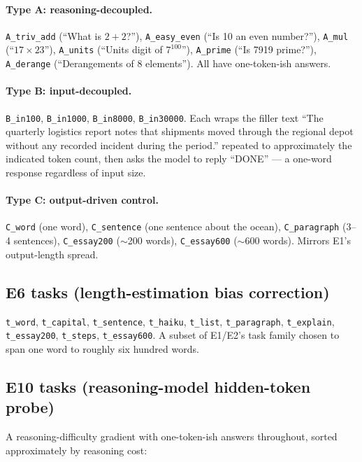 \documentclass[11pt]{article}
\newcommand{\code}[1]{\texttt{\small #1}}
\begin{document}
\paragraph{Type A: reasoning-decoupled.}
\code{A\_triv\_add} (``What is $2+2$?''),
\code{A\_easy\_even} (``Is 10 an even number?''),
\code{A\_mul} (``$17 \times 23$''),
\code{A\_units} (``Units digit of $7^{100}$''),
\code{A\_prime} (``Is 7919 prime?''),
\code{A\_derange} (``Derangements of 8 elements''). All have one-token-ish answers.

\paragraph{Type B: input-decoupled.}
\code{B\_in100}, \code{B\_in1000}, \code{B\_in8000}, \code{B\_in30000}. Each wraps the
filler text ``The quarterly logistics report notes that shipments moved through the regional
depot without any recorded incident during the period.'' repeated to approximately the
indicated token count, then asks the model to reply ``DONE'' --- a one-word response
regardless of input size.

\paragraph{Type C: output-driven control.}
\code{C\_word} (one word), \code{C\_sentence} (one sentence about the ocean),
\code{C\_paragraph} (3--4 sentences), \code{C\_essay200} ($\sim$200 words),
\code{C\_essay600} ($\sim$600 words). Mirrors E1's output-length spread.

\subsection{E6 tasks (length-estimation bias correction)}
\label{app:e6tasks}

\code{t\_word}, \code{t\_capital}, \code{t\_sentence}, \code{t\_haiku}, \code{t\_list},
\code{t\_paragraph}, \code{t\_explain}, \code{t\_essay200}, \code{t\_steps}, \code{t\_essay600}.
A subset of E1/E2's task family chosen to span one word to roughly six hundred words.

\subsection{E10 tasks (reasoning-model hidden-token probe)}
\label{app:e10tasks}

A reasoning-difficulty gradient with one-token-ish answers throughout, sorted approximately
by reasoning cost:
\end{document}
